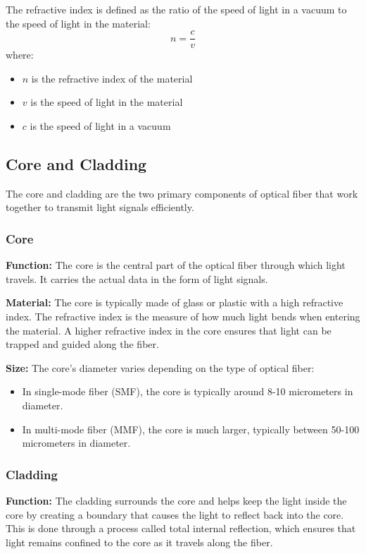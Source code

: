 \documentclass{article}
\theoremstyle{mytheoremstyle}
\theoremstyle{mytheoremstyle}
\theoremstyle{myproblemstyle}
\begin{document}
The refractive index is defined as the ratio of the speed of light in a vacuum to the speed of light in the material:
\[
n = \frac{c}{v}
\]
where:
\begin{itemize}
    \item \( n \) is the refractive index of the material
    \item \( v \) is the speed of light in the material
    \item \( c \) is the speed of light in a vacuum
\end{itemize}



\subsection{Core and Cladding}

The core and cladding are the two primary components of optical fiber that work together to transmit light signals efficiently.

\subsubsection{Core}

\textbf{Function:} The core is the central part of the optical fiber through which light travels. It carries the actual data in the form of light signals.

\textbf{Material:} The core is typically made of glass or plastic with a high refractive index. The refractive index is the measure of how much light bends when entering the material. A higher refractive index in the core ensures that light can be trapped and guided along the fiber.

\textbf{Size:} The core's diameter varies depending on the type of optical fiber:
\begin{itemize}
    \item In single-mode fiber (SMF), the core is typically around 8-10 micrometers in diameter.
    \item In multi-mode fiber (MMF), the core is much larger, typically between 50-100 micrometers in diameter.
\end{itemize}

\subsubsection{Cladding}

\textbf{Function:} The cladding surrounds the core and helps keep the light inside the core by creating a boundary that causes the light to reflect back into the core. This is done through a process called total internal reflection, which ensures that light remains confined to the core as it travels along the fiber.
\end{document}
